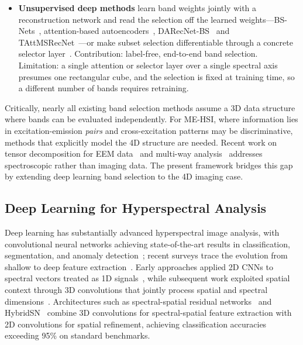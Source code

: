 \begin{itemize}
Limitation: labeled training data are required, limiting applicability when ground truth is scarce or expensive to obtain.
\item \textbf{Unsupervised deep methods} learn band weights jointly with a reconstruction network and read the selection off the learned weights---BS-Nets~\cite{cai2020bsnets}, attention-based autoencoders~\cite{dou2021attentionae}, DARecNet-BS~\cite{roy2021darecnet} and TAttMSRecNet~\cite{nandi2023tattmsrecnet}---or make subset selection differentiable through a concrete selector layer~\cite{sun2022concrete}.
Contribution: label-free, end-to-end band selection.
Limitation: a single attention or selector layer over a single spectral axis presumes one rectangular cube, and the selection is fixed at training time, so a different number of bands requires retraining.
\end{itemize}

Critically, nearly all existing band selection methods assume a 3D data structure where bands can be evaluated independently.
For ME-HSI, where information lies in excitation-emission \emph{pairs} and cross-excitation patterns may be discriminative, methods that explicitly model the 4D structure are needed.
Recent work on tensor decomposition for EEM data~\cite{murphy2013fluorescence} and multi-way analysis~\cite{bro1997parafac} addresses spectroscopic rather than imaging data.
The present framework bridges this gap by extending deep learning band selection to the 4D imaging case.

\subsection{Deep Learning for Hyperspectral Analysis}
\label{sec:related_dl}

Deep learning has substantially advanced hyperspectral image analysis, with convolutional neural networks achieving state-of-the-art results in classification, segmentation, and anomaly detection~\cite{li2019deep,paoletti2019deep}; recent surveys trace the evolution from shallow to deep feature extraction~\cite{rasti2020featureextraction,ahmad2022survey}.
Early approaches applied 2D CNNs to spectral vectors treated as 1D signals~\cite{hu2015deep}, while subsequent work exploited spatial context through 3D convolutions that jointly process spatial and spectral dimensions~\cite{chen2016deep}.
Architectures such as spectral-spatial residual networks~\cite{zhong2017spectral} and HybridSN~\cite{roy2020hybridsn} combine 3D convolutions for spectral-spatial feature extraction with 2D convolutions for spatial refinement, achieving classification accuracies exceeding 95\% on standard benchmarks.

